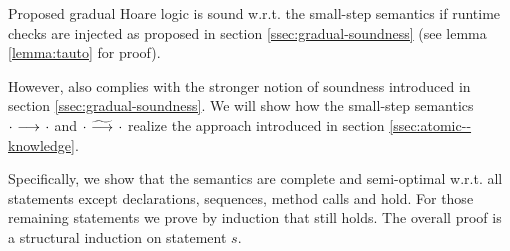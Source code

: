 Proposed gradual Hoare logic is sound w.r.t. the small-step semantics if runtime checks are injected as proposed in section \ref{ssec:gradual-soundness} (see lemma \ref{lemma:tauto} for proof).

However, \gvlidf also complies with the stronger notion of soundness  introduced in section \ref{ssec:gradual-soundness}.
We will show how the small-step semantics ${\cdot} \,\,{\longrightarrow^{}}\,\, {\cdot}$ and ${\cdot} \,\,{\widetilde{\longrightarrow}^{}}\,\, {\cdot}$ realize the approach introduced in section \ref{ssec:atomic--knowledge}.

Specifically, we show that the semantics are complete and semi-optimal w.r.t. all statements except declarations, sequences, method calls and hold.
For those remaining statements we prove by induction that  still holds.
The overall proof is a structural induction on statement $s$.

